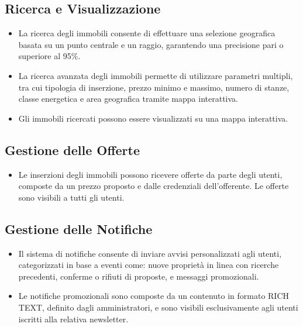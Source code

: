 \subsection*{Ricerca e Visualizzazione}
\begin{itemize}
    \item [D\textminus R1] La ricerca degli immobili consente di effettuare una selezione geografica basata su un punto centrale e un raggio, garantendo una precisione pari o superiore al 95\%.
    \item [D\textminus R2] La ricerca avanzata degli immobili permette di utilizzare parametri multipli, tra cui tipologia di inserzione, prezzo minimo e massimo, numero di stanze, classe energetica e area geografica tramite mappa interattiva.
    \item [D\textminus R3] Gli immobili ricercati possono essere visualizzati su una mappa interattiva.
\end{itemize}

\subsection*{Gestione delle Offerte}
\begin{itemize}
    \item [D\textminus O1] Le inserzioni degli immobili possono ricevere offerte da parte degli utenti, composte da un prezzo proposto e dalle credenziali dell’offerente. Le offerte sono visibili a tutti gli utenti.
\end{itemize}

\subsection*{Gestione delle Notifiche}
\begin{itemize}
    \item [D\textminus N1] Il sistema di notifiche consente di inviare avvisi personalizzati agli utenti, categorizzati in base a eventi come: nuove proprietà in linea con ricerche precedenti, conferme o rifiuti di proposte, e messaggi promozionali.
    \item [D\textminus N2] Le notifiche promozionali sono composte da un contenuto in formato RICH TEXT, definito dagli amministratori, e sono visibili esclusivamente agli utenti iscritti alla relativa newsletter.
\end{itemize}